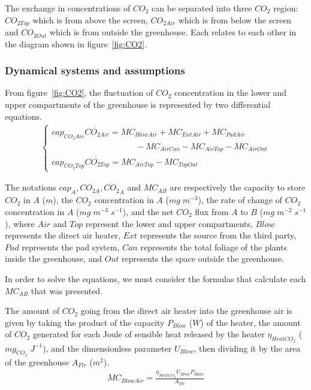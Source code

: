 \documentclass[a4paper]{article}
\begin{document}
The exchange in concentrations of \(CO_2\) can be separated into three \(CO_2\) region: \(CO_{2Top}\) which is from above the screen, \(CO_{2Air}\) which is from below the screen and \(CO_{2Out}\) which is from outside the greenhouse.
Each relates to each other in the diagram shown in figure~\ref{fig:CO2}.

\subsubsection{Dynamical systems and assumptions}
From figure~\ref{fig:CO2}, the fluctuation of \(CO_2\) concentration in the lower and upper compartments of the greenhouse is represented by two differential equations.
\begin{align}
  \begin{cases}
    cap_{CO_2Air}\dot{CO_{2Air}} = MC_{BlowAir} + MC_{ExtAir} + MC_{PadAir} \\ \qquad \qquad \qquad \qquad \qquad
    - MC_{AirCan} - MC_{AirTop} - MC_{AirOut}                               \\
    cap_{CO_2Top}\dot{CO_{2Top}} = MC_{AirTop} - MC_{TopOut}
  \end{cases}
\end{align}

The notations \(cap_A, CO_{2 A}, \dot{CO_2}_A\) and \(MC_{AB}\) are respectively the capacity to store \(CO_2\) in \(A\) (\(m\)), the \(CO_2\) concentration in \(A\) (\(mg\;m^{-3}\)), the rate of change of \(CO_2\) concentration in \(A\) (\(mg\;m^{-3}\;s^{-1}\)), and the net \(CO_2\) flux from \(A\) to \(B\) (\(mg\;m^{-2}\;s^{-1}\)), where \(Air\) and \(Top\) represent the lower and upper compartments, \(Blow\) represents the direct air heater, \(Ext\) represents the source from the third party, \(Pad\) represents the pad system, \(Can\) represents the total foliage of the plants inside the greenhouse, and \(Out\) represents the space outside the greenhouse.

In order to solve the equations, we must consider the formulas that calculate each \(MC_{AB}\) that was presented.

The amount of \(CO_2\) going from the direct air heater into the greenhouse air is given by taking the product of the capacity \(P_{Blow}\) (\(W\)) of the heater, the amount of \(CO_2\) generated for each Joule of sensible heat released by the heater \(\eta_{HeatCO_2}\) (\(mg_{CO_2}\;J^{-1}\)), and the dimensionless parameter \(U_{Blow}\), then dividing it by the area of the greenhouse \(A_{Flr}\) (\(m^2\)).
\begin{align}
  MC_{BlowAir} = \frac{\eta_{HeatCO_2}U_{Blow}P_{Blow}}{A_{Flr}}
\end{align}
\end{document}
